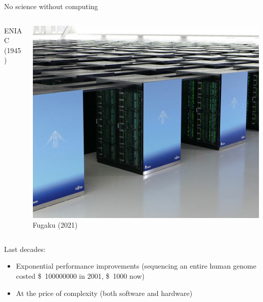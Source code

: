 \documentclass[10pt]{beamer}
\begin{document}
\begin{frame}{No science without computing}
\begin{columns}
\begin{column}[c]{.33\columnwidth}
            ENIAC (1945)
        \end{column}
        \begin{column}[c]{.33\columnwidth}
            \includegraphics[width=\linewidth]{img/slides/fugaku.jpg}
            Fugaku (2021)
        \end{column}
    \end{columns}
    \vfill

    \pause

    Last decades:
    \begin{itemize}
        \item Exponential \alert{performance} improvements
        (\eg sequencing an entire human genome costed \SI{100000000}[\$]{} in 2001, \SI{1000}[\$]{} now)
        \item At the price of \alert{complexity} (both software and hardware)
    \end{itemize}
\end{frame}
\end{document}
